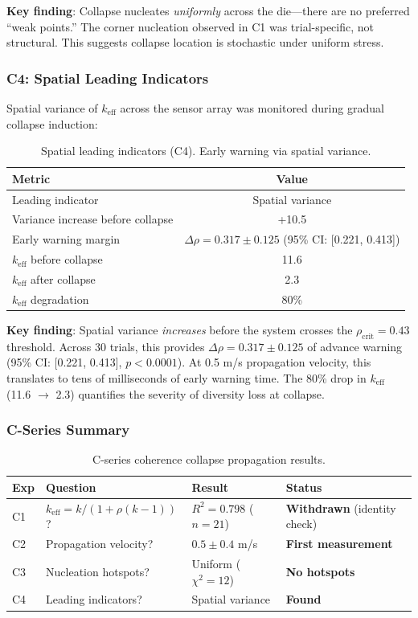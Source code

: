 \documentclass[11pt,a4paper]{article}
\theoremstyle{definition}
\theoremstyle{remark}
\newcommand{\keff}{k_{\text{eff}}}
\begin{document}
\textbf{Key finding}: Collapse nucleates \textit{uniformly} across the die---there are no preferred ``weak points.'' The corner nucleation observed in C1 was trial-specific, not structural. This suggests collapse location is stochastic under uniform stress.

\subsubsection{C4: Spatial Leading Indicators}

Spatial variance of $\keff$ across the sensor array was monitored during gradual collapse induction:

\begin{table}[H]
\centering
\begin{tabular}{lc}
\toprule
\textbf{Metric} & \textbf{Value} \\
\midrule
Leading indicator & Spatial variance \\
Variance increase before collapse & +10.5 \\
Early warning margin & $\Delta\rho = 0.317 \pm 0.125$ (95\% CI: [0.221, 0.413]) \\
$\keff$ before collapse & 11.6 \\
$\keff$ after collapse & 2.3 \\
$\keff$ degradation & 80\% \\
\bottomrule
\end{tabular}
\caption{Spatial leading indicators (C4). Early warning via spatial variance.}
\end{table}

\textbf{Key finding}: Spatial variance \textit{increases} before the system crosses the $\rho_{\text{crit}} = 0.43$ threshold. Across 30 trials, this provides $\Delta\rho = 0.317 \pm 0.125$ of advance warning (95\% CI: [0.221, 0.413], $p < 0.0001$). At 0.5 m/s propagation velocity, this translates to tens of milliseconds of early warning time. The 80\% drop in $\keff$ (11.6 $\to$ 2.3) quantifies the severity of diversity loss at collapse.

\subsubsection{C-Series Summary}

\begin{table}[H]
\centering
\begin{tabular}{llll}
\toprule
\textbf{Exp} & \textbf{Question} & \textbf{Result} & \textbf{Status} \\
\midrule
C1 & $\keff = k/(1+\rho(k-1))$? & $R^2 = 0.798$ ($n=21$) & \textbf{Withdrawn} (identity check) \\
C2 & Propagation velocity? & $0.5 \pm 0.4$ m/s & \textbf{First measurement} \\
C3 & Nucleation hotspots? & Uniform ($\chi^2=12$) & \textbf{No hotspots} \\
C4 & Leading indicators? & Spatial variance & \textbf{Found} \\
\bottomrule
\end{tabular}
\caption{C-series coherence collapse propagation results.}
\end{table}
\end{document}

